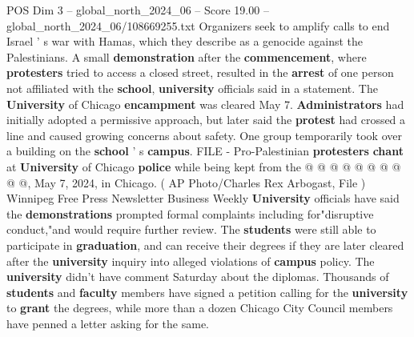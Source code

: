 \begin{textsample}{POS Dim 3 – global\_north\_2024\_06 – Score 19.00 – global\_north\_2024\_06/108669255.txt}
Organizers seek to amplify calls to end Israel ' s war with Hamas, which they describe as a genocide against the Palestinians.
A small \textbf{demonstration} after the \textbf{commencement}, where \textbf{protesters} tried to access a closed street, resulted in the \textbf{arrest} of one person not affiliated with the \textbf{school}, \textbf{university} officials said in a statement.
The \textbf{University} of Chicago \textbf{encampment} was cleared May 7. \textbf{Administrators} had initially adopted a permissive approach, but later said the \textbf{protest} had crossed a line and caused growing concerns about safety.
One group temporarily took over a building on the \textbf{school} ' s \textbf{campus}.
FILE - Pro-Palestinian \textbf{protesters} \textbf{chant} at \textbf{University} of Chicago \textbf{police} while being kept from the @ @ @ @ @ @ @ @ @ @, May 7, 2024, in Chicago. ( AP Photo/Charles Rex Arbogast, File ) Winnipeg Free Press Newsletter Business Weekly \textbf{University} officials have said the \textbf{demonstrations} prompted formal complaints including for"disruptive conduct,"and would require further review.
The \textbf{students} were still able to participate in \textbf{graduation}, and can receive their degrees if they are later cleared after the \textbf{university} inquiry into alleged violations of \textbf{campus} policy.
The \textbf{university} didn't have comment Saturday about the diplomas.
Thousands of \textbf{students} and \textbf{faculty} members have signed a petition calling for the \textbf{university} to \textbf{grant} the degrees, while more than a dozen Chicago City Council members have penned a letter asking for the same.

\end{textsample}
